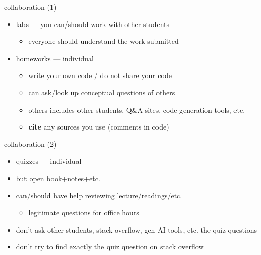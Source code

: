 \begin{frame}{collaboration (1)}
    \begin{itemize}
    \item labs --- you can/should work with other students
        \begin{itemize}
        \item everyone should understand the work submitted
        \end{itemize}
    \item homeworks --- individual
        \begin{itemize}
        \item write your own code / do not share your code
        \item can ask/look up conceptual questions of others
        \item others includes other students, Q\&A sites, code generation tools, etc.
        \item \textbf{cite} any sources you use (comments in code)
        \end{itemize}
    \end{itemize}
\end{frame}

\begin{frame}{collaboration (2)}
    \begin{itemize}
    \item quizzes --- individual
    \vspace{.5cm}
    \item but open book+notes+etc.
    \item can/should have help reviewing lecture/readings/etc.
        \begin{itemize}
        \item legitimate questions for office hours
        \end{itemize}
    \item don't ask other students, stack overflow, gen AI tools, etc. the quiz questions
    \item don't try to find exactly the quiz question on stack overflow
    \end{itemize}
\end{frame}
